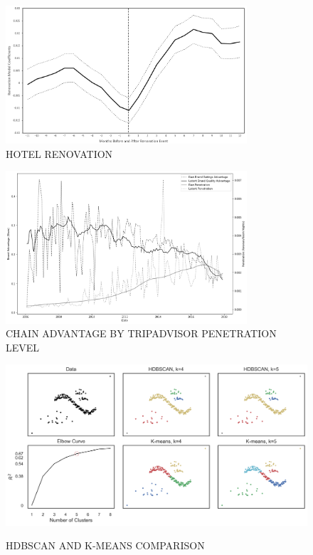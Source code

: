 \documentclass[mksc,blindrev]{informs3} %
\begin{document}
\begin{figure}[hp]
\caption{HOTEL RENOVATION}
 \label{fig:reno_reg}
 \centering
 \includegraphics[width=0.8\textwidth,height=\textheight,keepaspectratio]{./Figures/Reno_Reg.png}
\end{figure}
\clearpage

\begin{figure}[hp]
\caption{CHAIN ADVANTAGE BY TRIPADVISOR PENETRATION LEVEL}
 \label{fig:modelfree}
 \centering
 \includegraphics[width=0.8\textwidth,height=\textheight,keepaspectratio]{./Figures/OTA_Brand_v_Chain_v_Penetration.png}
\end{figure}
\clearpage

\begin{figure}[hp]
\caption{HDBSCAN AND K-MEANS COMPARISON}
 \centering  
{\includegraphics[width=\textwidth,height=\textheight,keepaspectratio]{./Figures/clusters.png} 
\label{fig:cluster}}
\end{figure}
\end{document}
